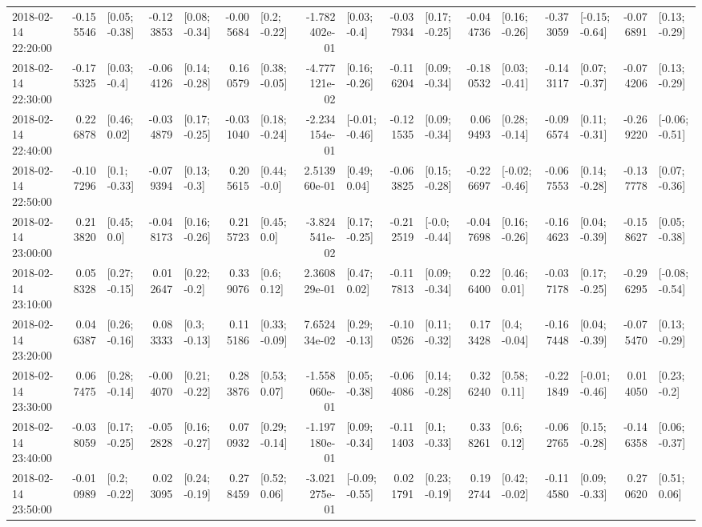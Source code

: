 \begin{tabular}{lrlrlrlrlrlrlrlrl}
2018-02-14 22:20:00 & -0.155546 &   [0.05; -0.38] & -0.123853 &   [0.08; -0.34] & -0.005684 &    [0.2; -0.22] & -1.782402e-01 &    [0.03; -0.4] & -0.037934 &   [0.17; -0.25] & -0.044736 &   [0.16; -0.26] & -0.373059 &  [-0.15; -0.64] & -0.076891 &   [0.13; -0.29] \\
2018-02-14 22:30:00 & -0.175325 &    [0.03; -0.4] & -0.064126 &   [0.14; -0.28] &  0.160579 &   [0.38; -0.05] & -4.777121e-02 &   [0.16; -0.26] & -0.116204 &   [0.09; -0.34] & -0.180532 &   [0.03; -0.41] & -0.143117 &   [0.07; -0.37] & -0.074206 &   [0.13; -0.29] \\
2018-02-14 22:40:00 &  0.226878 &    [0.46; 0.02] & -0.034879 &   [0.17; -0.25] & -0.031040 &   [0.18; -0.24] & -2.234154e-01 &  [-0.01; -0.46] & -0.121535 &   [0.09; -0.34] &  0.069493 &   [0.28; -0.14] & -0.096574 &   [0.11; -0.31] & -0.269220 &  [-0.06; -0.51] \\
2018-02-14 22:50:00 & -0.107296 &    [0.1; -0.33] & -0.079394 &    [0.13; -0.3] &  0.205615 &    [0.44; -0.0] &  2.513960e-01 &    [0.49; 0.04] & -0.063825 &   [0.15; -0.28] & -0.226697 &  [-0.02; -0.46] & -0.067553 &   [0.14; -0.28] & -0.137778 &   [0.07; -0.36] \\
2018-02-14 23:00:00 &  0.213820 &     [0.45; 0.0] & -0.048173 &   [0.16; -0.26] &  0.215723 &     [0.45; 0.0] & -3.824541e-02 &   [0.17; -0.25] & -0.212519 &   [-0.0; -0.44] & -0.047698 &   [0.16; -0.26] & -0.164623 &   [0.04; -0.39] & -0.158627 &   [0.05; -0.38] \\
2018-02-14 23:10:00 &  0.058328 &   [0.27; -0.15] &  0.012647 &    [0.22; -0.2] &  0.339076 &     [0.6; 0.12] &  2.360829e-01 &    [0.47; 0.02] & -0.117813 &   [0.09; -0.34] &  0.226400 &    [0.46; 0.01] & -0.037178 &   [0.17; -0.25] & -0.296295 &  [-0.08; -0.54] \\
2018-02-14 23:20:00 &  0.046387 &   [0.26; -0.16] &  0.083333 &    [0.3; -0.13] &  0.115186 &   [0.33; -0.09] &  7.652434e-02 &   [0.29; -0.13] & -0.100526 &   [0.11; -0.32] &  0.173428 &    [0.4; -0.04] & -0.167448 &   [0.04; -0.39] & -0.075470 &   [0.13; -0.29] \\
2018-02-14 23:30:00 &  0.067475 &   [0.28; -0.14] & -0.004070 &   [0.21; -0.22] &  0.283876 &    [0.53; 0.07] & -1.558060e-01 &   [0.05; -0.38] & -0.064086 &   [0.14; -0.28] &  0.326240 &    [0.58; 0.11] & -0.221849 &  [-0.01; -0.46] &  0.014050 &    [0.23; -0.2] \\
2018-02-14 23:40:00 & -0.038059 &   [0.17; -0.25] & -0.052828 &   [0.16; -0.27] &  0.070932 &   [0.29; -0.14] & -1.197180e-01 &   [0.09; -0.34] & -0.111403 &    [0.1; -0.33] &  0.338261 &     [0.6; 0.12] & -0.062765 &   [0.15; -0.28] & -0.146358 &   [0.06; -0.37] \\
2018-02-14 23:50:00 & -0.010989 &    [0.2; -0.22] &  0.023095 &   [0.24; -0.19] &  0.278459 &    [0.52; 0.06] & -3.021275e-01 &  [-0.09; -0.55] &  0.021791 &   [0.23; -0.19] &  0.192744 &   [0.42; -0.02] & -0.114580 &   [0.09; -0.33] &  0.270620 &    [0.51; 0.06] \\
\bottomrule
\end{tabular}
